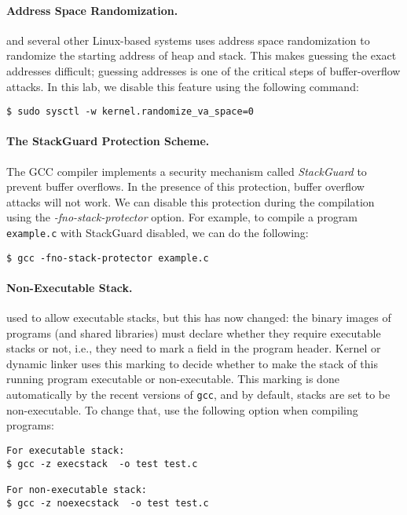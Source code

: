 \paragraph{Address Space Randomization.}
\ubuntu and several other Linux-based systems uses address space
randomization to randomize the starting address of heap and
stack. This makes guessing the exact addresses difficult; guessing
addresses is one of the critical steps of buffer-overflow attacks.  In
this lab, we disable this feature using the following command:

\begin{lstlisting}
$ sudo sysctl -w kernel.randomize_va_space=0
\end{lstlisting}


\paragraph{The StackGuard Protection Scheme.}
The GCC compiler implements a security mechanism called
\textit{StackGuard} to prevent buffer overflows. In the presence of this
protection, buffer overflow attacks will not work. We can disable this
protection during the compilation using the 
\emph{-fno-stack-protector} option. For example, to compile a program
\texttt{example.c} with StackGuard disabled, we can do the following:


\begin{lstlisting}
$ gcc -fno-stack-protector example.c
\end{lstlisting}


\paragraph{Non-Executable Stack.} \ubuntu used to allow executable stacks, but
this has now changed: the binary images of programs (and shared libraries) 
must declare whether they require executable stacks or not, i.e., they need to 
mark a field in the program header. Kernel or dynamic linker uses this marking
to decide whether to make the stack of this running program executable or 
non-executable. This marking is done automatically by the 
recent versions of {\tt gcc}, and by default, stacks are set to 
be non-executable.
To change that, use the following option when compiling programs:


\begin{lstlisting}
For executable stack:
$ gcc -z execstack  -o test test.c

For non-executable stack:
$ gcc -z noexecstack  -o test test.c
\end{lstlisting}



